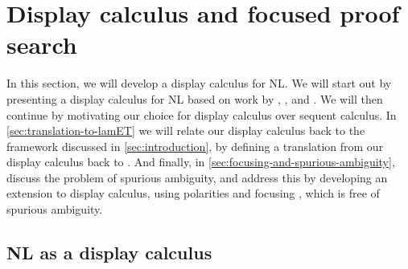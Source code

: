 \section{Display calculus and focused proof search}
\label{sec:display-calculus}

In this section, we will develop a display calculus
\citep{belnap1982} for NL. We will start out by presenting a display
calculus for NL based on work by \citet{moortgat2009},
\citet{bernardi2010}, \citet{moortgat2012} and \citet{gore1998}. We
will then continue by motivating our choice for display calculus over
sequent calculus.
In \autoref{sec:translation-to-lamET} we will relate our display
calculus back to the framework discussed in \autoref{sec:introduction},
by defining a translation from our display calculus back to \lamPET.
And finally, in \autoref{sec:focusing-and-spurious-ambiguity}, discuss
the problem of spurious ambiguity, and address this by developing an
extension to display calculus, using polarities and focusing
\citep{girard1991,bastenhof2011}, which is free of spurious
ambiguity.



\subsection{NL as a display calculus}
\label{sec:nl-as-a-display-calculus}


